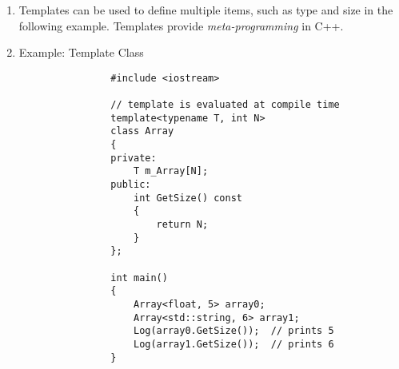 \documentclass{article}
\begin{document}
\begin{enumerate}
        \item Templates can be used to define multiple items, such as type and size in the following example. Templates provide \textit{meta-programming} in C++.
        \item Example: Template Class
            \begin{lstlisting}
                #include <iostream>
                
                // template is evaluated at compile time
                template<typename T, int N>
                class Array
                {
                private:
                	T m_Array[N];
                public:
                	int GetSize() const
                	{
                		return N;
                	}
                };

                int main()
                {
                	Array<float, 5> array0;
                	Array<std::string, 6> array1;
                	Log(array0.GetSize());	// prints 5
                	Log(array1.GetSize());	// prints 6
                }

            \end{lstlisting}
    
    \end{enumerate}
    
\end{document}
